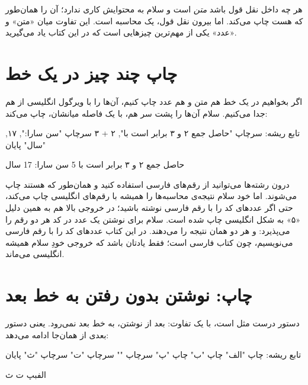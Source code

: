 هر چه داخل نقل قول باشد \emph{متن} است و سلام به محتوایش کاری ندارد؛ آن را
همان‌طور که هست چاپ می‌کند. اما بیرون نقل قول،  یک محاسبه است.
این تفاوت میان «متن» و «عدد» یکی از مهم‌ترین چیزهایی است که در این کتاب یاد
می‌گیرید.

\section{چاپ چند چیز در یک خط}

اگر بخواهیم در یک خط هم متن و هم عدد چاپ کنیم، آن‌ها را با ویرگول
انگلیسی \code{,} از هم جدا می‌کنیم. سلام آن‌ها را پشت سر هم، با یک فاصله
میانشان، چاپ می‌کند:

\begin{salamfa}
تابع ریشه:
    سرچاپ "حاصل جمع ۲ و ۳ برابر است با", ۲ + ۳
    سرچاپ "سن سارا:", ۱۷, "سال"
پایان
\end{salamfa}

\begin{outputfa}
حاصل جمع ۲ و ۳ برابر است با 5
سن سارا: 17 سال
\end{outputfa}

\begin{note}
درون رشته‌ها می‌توانید از رقم‌های فارسی استفاده کنید و همان‌طور که هستند
چاپ می‌شوند. اما خود سلام نتیجه‌ی محاسبه‌ها را همیشه با رقم‌های انگلیسی
چاپ می‌کند، حتی اگر عددهای کد را با رقم فارسی نوشته باشید؛ در خروجی
بالا هم به همین دلیل «۵» به شکل انگلیسی  چاپ شده است. سلام برای
نوشتن یک عدد در کد هر دو رقم را می‌پذیرد:  و
 هر دو همان نتیجه را می‌دهند. در این کتاب عددهای کد را
با رقم فارسی می‌نویسیم، چون کتاب فارسی است؛ فقط یادتان باشد که خروجی
خودِ سلام همیشه انگلیسی می‌ماند.
\end{note}

\section{چاپ: نوشتن بدون رفتن به خط بعد}

دستور  درست مثل  است، با یک تفاوت: بعد از نوشتن، به
خط بعد نمی‌رود. یعنی دستور بعدی از همان‌جا ادامه می‌دهد:

\begin{salamfa}
تابع ریشه:
    چاپ "الف"
    چاپ "ب"
    چاپ "پ"
    سرچاپ ""
    سرچاپ "ت"
    سرچاپ "ث"
پایان
\end{salamfa}

\begin{outputfa}
الفبپ
ت
ث
\end{outputfa}

